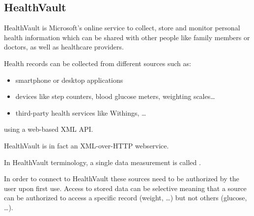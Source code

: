 \subsection{HealthVault} \nocite{HealthVault}


HealthVault is Microsoft's online service to collect, store and monitor personal health information
which can be shared with other people like family members or doctors, as well as 
healthcare providers.




Health records can be collected from different sources such as:
\begin{itemize}
\item smartphone or desktop applications
\item devices like step counters, blood glucose meters, weighting scales\ldots
\item third-party health services like Withings, \ldots
\end{itemize}
using a web-based XML API.


HealthVault is in fact an XML-over-HTTP webservice.



In HealthVault terminology, a single data measurement is called .


In order to connect to HealthVault these sources need to be authorized by the user upon first use.
Access to stored data can be selective meaning that a source can be authorized to access
a specific record (weight, \ldots) but not others (glucose, \ldots).






